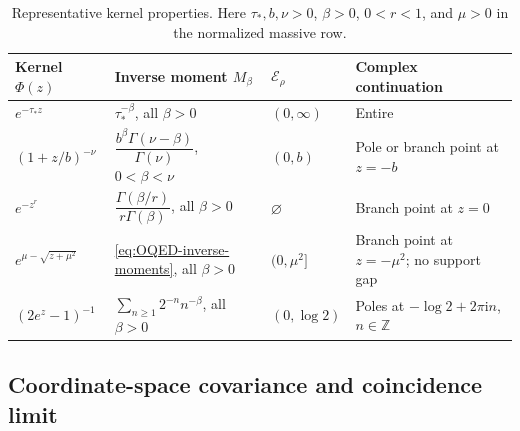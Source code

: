 \documentclass[final,5p,times,twocolumn,numbers,nopreprintline]{elsarticle}
\numberwithin{equation}{section}
\theoremstyle{definition}
\theoremstyle{remark}
\newcommand{\ii}{\mathrm i}
\newcommand{\Ph}{\Phi}
\begin{document}
\begin{table}[t]
\centering
\small
\setlength{\tabcolsep}{3pt}
\renewcommand{\arraystretch}{1.2}
\caption{Representative kernel properties. Here
\(\tau_*,b,\nu>0\), \(\beta>0\), \(0<r<1\), and \(\mu>0\)
in the normalized massive row.}
\label{tab:kernel-comparison}
\begin{tabularx}{\textwidth}{@{}>{\raggedright\arraybackslash}p{}
 >{\raggedright\arraybackslash}p{}
 >{\raggedright\arraybackslash}p{}
 >{\raggedright\arraybackslash}X@{}}
\toprule
Kernel \(\Ph(z)\) & Inverse moment \(M_\beta\) &
\(\mathcal E_\rho\) & Complex continuation\\
\midrule
\(e^{-\tau_*z}\) & \(\tau_*^{-\beta}\), all \(\beta>0\) &
\((0,\infty)\) & Entire\\
\((1+z/b)^{-\nu}\) &
\(\dfrac{b^\beta\Gamma(\nu-\beta)}{\Gamma(\nu)}\),
\(0<\beta<\nu\) & \((0,b)\) &
Pole or branch point at \(z=-b\)\\
\(e^{-z^r}\) &
\(\dfrac{\Gamma(\beta/r)}{r\Gamma(\beta)}\), all \(\beta>0\) &
\(\varnothing\) & Branch point at \(z=0\)\\
\(e^{\mu-\sqrt{z+\mu^2}}\) &
\eqref{eq:OQED-inverse-moments}, all \(\beta>0\) &
\((0,\mu^2]\) & Branch point at \(z=-\mu^2\); no support gap\\
\((2e^z-1)^{-1}\) &
\(\sum_{n\geq1}2^{-n}n^{-\beta}\), all \(\beta>0\) &
\((0,\log2)\) & Poles at \(-\log2+2\pi\ii n\),
\(n\in\mathbb Z\)\\
\bottomrule
\end{tabularx}
\end{table}

\subsection{Coordinate-space covariance and coincidence limit}
\end{document}
